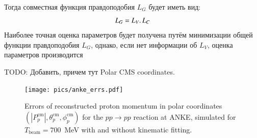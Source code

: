 Тогда совместная функция правдоподобия $L_G$ будет иметь вид:
\begin{equation}
 \label{FPG}
 L_G = L_V \ldotp L_C
\end{equation}
Наиболее точная оценка параметров будет получена путём минимизации общей функции правдоподобия $L_G$, однако, если нет информации об $L_V$, оценка параметров производится

TODO: Добавить, причем тут Polar CMS coordinates.




\begin{figure}[h]
\centering
\centering\texttt{[image: pics/anke\_errs.pdf]}
\caption{
Errors of reconstructed proton momentum in polar coordinates $(|P_p^\mathrm{cm}|, \theta_p^\mathrm{cm}, \phi_p^\mathrm{cm})$ for the $pp \to pp$ reaction at ANKE, simulated for $T_\mathrm{beam} = 700$~MeV with and without kinematic fitting.
}
\label{anke_scheme}
\end{figure}
